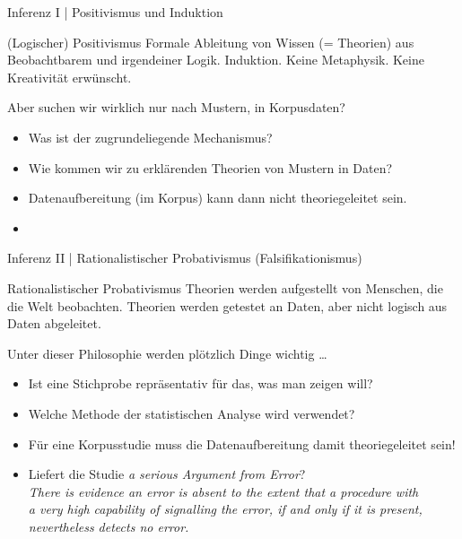 \begin{frame}
  {Inferenz I | Positivismus und Induktion}
  \onslide<+->
  \onslide<+->
  \begin{block}
    {(Logischer) Positivismus}
    \alert{Formale} Ableitung von Wissen (= Theorien) aus Beobachtbarem und irgendeiner Logik. \alert{Induktion}. Keine Metaphysik. Keine Kreativität erwünscht.  
  \end{block}
  \Zeile
  \onslide<+->
  Aber suchen wir wirklich nur nach \alert{Mustern}, \zB in Korpusdaten?\\
    \Halbzeile
    \begin{itemize}[<+->]
      \item Was ist der \alert{zugrundeliegende Mechanismus}?
      \item Wie kommen wir zu \alert{erklärenden Theorien} von Mustern in Daten?
      \item \alert{Datenaufbereitung} (\zB im Korpus) kann dann nicht theoriegeleitet sein.
        \Halbzeile
      \item {}
    \end{itemize}
\end{frame}

\begin{frame}
  {Inferenz II | Rationalistischer Probativismus (Falsifikationismus)}
  \onslide<+->
  \onslide<+->
  \begin{block}
    {Rationalistischer Probativismus}
    Theorien werden aufgestellt von \alert{Menschen, die die Welt beobachten}. Theorien werden getestet an Daten, aber nicht logisch aus Daten abgeleitet. 
  \end{block}
  \onslide<+->
  \Zeile
  Unter dieser Philosophie werden plötzlich Dinge wichtig \ldots
    \Halbzeile
    \begin{itemize}[<+->]
      \item Ist eine \alert{Stichprobe repräsentativ} für das, was man zeigen will?
      \item Welche \alert{Methode der statistischen Analyse} wird verwendet?
      \item Für eine Korpusstudie muss die Datenaufbereitung damit theoriegeleitet sein!
      \item Liefert die Studie \alert{\textit{a serious Argument from Error}}?\\
        \onslide<+->
        \Halbzeile
        {\small\textit{There is evidence an error is absent to the extent that a \alert{procedure with\\
        a very high capability of signalling the error}, if and only if it is present,\\
      nevertheless detects no error.} }\\
    \end{itemize}
\end{frame}




